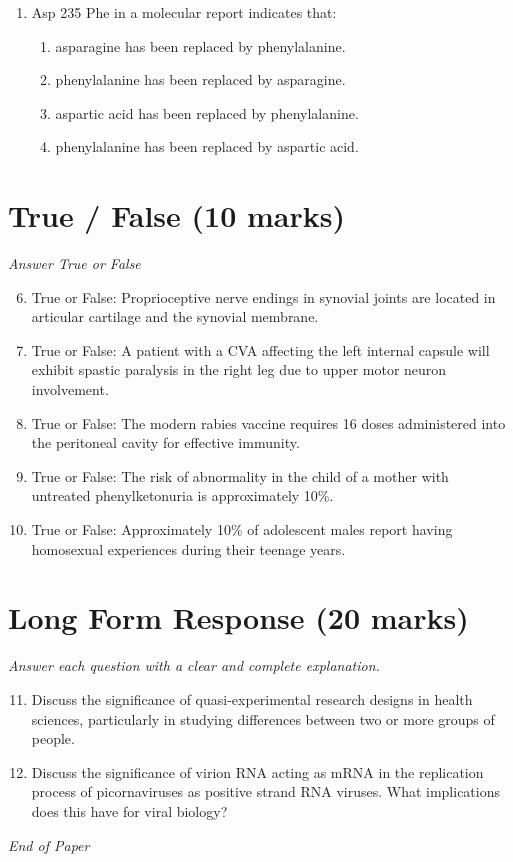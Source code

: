 \documentclass[12pt]{article}
\begin{document}
\begin{enumerate}[label=\arabic*.]
\begin{enumerate}[label=(\alph*)]
    \item An older Hispanic American woman
    \item An older African American woman
    \item An older Asian American woman
    \item An older Native American woman
\end{enumerate}
\item Asp 235 Phe in a molecular report indicates that:
\begin{enumerate}[label=(\alph*)]
    \item asparagine has been replaced by phenylalanine.
    \item phenylalanine has been replaced by asparagine.
    \item aspartic acid has been replaced by phenylalanine.
    \item phenylalanine has been replaced by aspartic acid.
\end{enumerate}
\end{enumerate}

\section*{True / False (10 marks)}
\textit{Answer True or False}
\begin{enumerate}[label=\arabic*.]
\setcounter{enumi}{5}
\item True or False: Proprioceptive nerve endings in synovial joints are located in articular cartilage and the synovial membrane.
\item True or False: A patient with a CVA affecting the left internal capsule will exhibit spastic paralysis in the right leg due to upper motor neuron involvement.
\item True or False: The modern rabies vaccine requires 16 doses administered into the peritoneal cavity for effective immunity.
\item True or False: The risk of abnormality in the child of a mother with untreated phenylketonuria is approximately 10\%.
\item True or False: Approximately 10\% of adolescent males report having homosexual experiences during their teenage years.
\end{enumerate}

\section*{Long Form Response (20 marks)}
\textit{Answer each question with a clear and complete explanation.}
\begin{enumerate}[label=\arabic*.]
\setcounter{enumi}{10}
\item Discuss the significance of quasi-experimental research designs in health sciences, particularly in studying differences between two or more groups of people.
\item Discuss the significance of virion RNA acting as mRNA in the replication process of picornaviruses as positive strand RNA viruses. What implications does this have for viral biology?
\end{enumerate}

\vfill
\noindent\textit{End of Paper}
\end{document}
